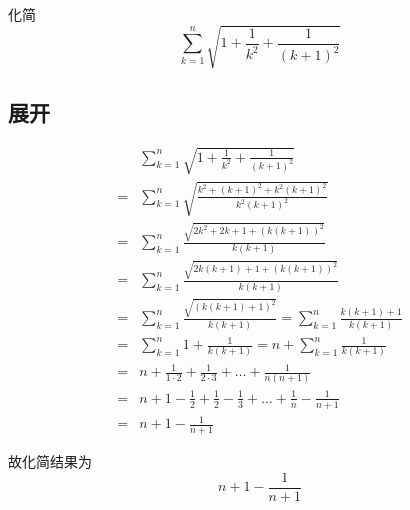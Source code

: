 

化简
\[ \sum_{k = 1}^n \sqrt{1 + \frac1{k^2} + \frac1{(k + 1)^2}} \]


\subsection{展开}

\begin{align*}
  & \sum_{k = 1}^n \sqrt{1 + \frac1{k^2} + \frac1{(k + 1)^2}} \\
  ={}& \sum_{k = 1}^n \sqrt{\frac{k^2 + (k + 1)^2 + k^2(k + 1)^2}{k^2(k + 1)^2}} \\
  ={}& \sum_{k = 1}^n \frac{\sqrt{2k^2 + 2k + 1 + (k(k + 1))^2}}{k(k + 1)} \\
  ={}& \sum_{k = 1}^n \frac{\sqrt{2k(k + 1) + 1 + (k(k + 1))^2}}{k(k + 1)} \\
  ={}& \sum_{k = 1}^n \frac{\sqrt{(k(k + 1) + 1)^2}}{k(k + 1)} = \sum_{k = 1}^n \frac{k(k + 1) + 1}{k(k + 1)} \\
  ={}& \sum_{k = 1}^n 1 + \frac1{k(k + 1)} = n + \sum_{k = 1}^n \frac1{k(k + 1)} \\
  ={}& n + \frac1{1\cdot2} + \frac1{2\cdot3} + \dots + \frac1{n(n + 1)} \\
  ={}& n + 1 - \frac12 + \frac12 - \frac13 + \dots + \frac1n - \frac1{n + 1} \\
  ={}& n + 1 - \frac1{n + 1}
\end{align*}

故化简结果为
\[ n + 1 - \frac1{n + 1} \]
